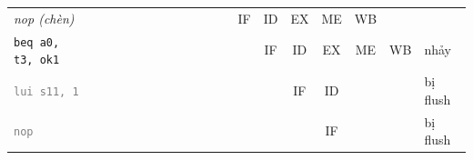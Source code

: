 \begin{tabular}{@{}lcccccccccccccccccl@{}}
\textit{nop (chèn)} &  &  &  &  &  &  &  &  &  &  &  & \cellcolor{cIF}\tiny IF & \cellcolor{cID}\tiny ID & \cellcolor{cEX}\tiny EX & \cellcolor{cME}\tiny ME & \cellcolor{cWB}\tiny WB &  &  \\
\texttt{beq a0, t3, ok1} &  &  &  &  &  &  &  &  &  &  &  &  & \cellcolor{cIF}\tiny IF & \cellcolor{cID}\tiny ID & \cellcolor{cEX}\tiny EX & \cellcolor{cME}\tiny ME & \cellcolor{cWB}\tiny WB & nhảy \\
\textcolor{gray}{\texttt{lui s11, 1}} &  &  &  &  &  &  &  &  &  &  &  &  &  & \cellcolor{cIF}\tiny IF & \cellcolor{cID}\tiny ID &  &  & bị flush \\
\textcolor{gray}{\texttt{nop}} &  &  &  &  &  &  &  &  &  &  &  &  &  &  & \cellcolor{cIF}\tiny IF &  &  & bị flush \\
\bottomrule
\end{tabular}
